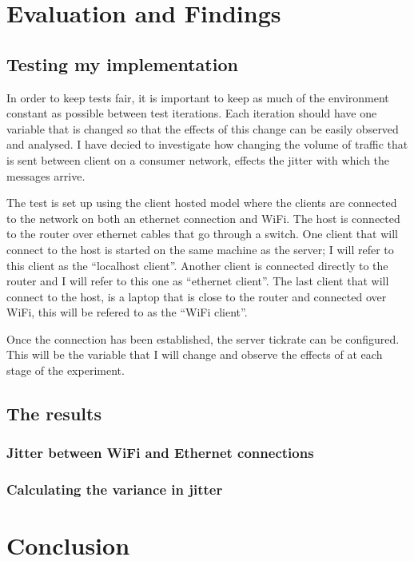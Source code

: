 \chapter{Evaluation and Findings}



\section{Testing my implementation}
In order to keep tests fair, it is important to keep as much of the environment constant as possible between test iterations. Each iteration should have one variable that is changed so that the effects of this change can be easily observed and analysed. I have decied to investigate how changing the volume of traffic that is sent between client on a consumer network, effects the jitter with which the messages arrive.

The test is set up using the client hosted model where the clients are connected to the network on both an ethernet connection and WiFi. The host is connected to the router over ethernet cables that go through a switch. One client that will connect to the host is started on the same machine as the server; I will refer to this client as the ``localhost client''. Another client is connected directly to the router and I will refer to this one as ``ethernet client''. The last client that will connect to the host, is a laptop that is close to the router and connected over WiFi, this will be refered to as the ``WiFi client''.

Once the connection has been established, the server tickrate can be configured. This will be the variable that I will change and observe the effects of at each stage of the experiment.

\section{The results}

\subsection{Jitter between WiFi and Ethernet connections}






\subsection{Calculating the variance in jitter}



\chapter{Conclusion}
